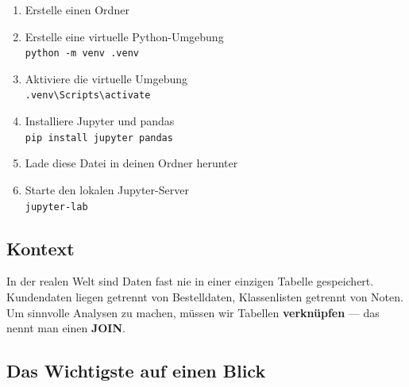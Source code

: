 \documentclass[
  nswissgerman,
  a4paper,
  DIV=11,
  numbers=noendperiod,
  ngerman]{scrreprt}
\providecommand{\tightlist}{%
  \setlength{\itemsep}{0pt}\setlength{\parskip}{0pt}}
\begin{document}
\begin{tcolorbox}[enhanced jigsaw, arc=.35mm, bottomrule=.15mm, bottomtitle=1mm, breakable, colback=white, colbacktitle=quarto-callout-note-color!10!white, colframe=quarto-callout-note-color-frame, coltitle=black, left=2mm, leftrule=.75mm, opacityback=0, opacitybacktitle=0.6, rightrule=.15mm, title=\textcolor{quarto-callout-note-color}{\faInfo}\hspace{0.5em}{Wie man dieses Notebook lokal ausführt}, titlerule=0mm, toprule=.15mm, toptitle=1mm]

\begin{enumerate}
\def\labelenumi{\arabic{enumi}.}
\tightlist
\item
  Erstelle einen Ordner
\item
  Erstelle eine virtuelle Python-Umgebung\\
  \texttt{python\ -m\ venv\ .venv}
\item
  Aktiviere die virtuelle Umgebung\\
  \texttt{.venv\textbackslash{}Scripts\textbackslash{}activate}
\item
  Installiere Jupyter und pandas\\
  \texttt{pip\ install\ jupyter\ pandas}
\item
  Lade diese Datei in deinen Ordner herunter
\item
  Starte den lokalen Jupyter-Server\\
  \texttt{jupyter-lab}
\end{enumerate}

\end{tcolorbox}

\subsection{Kontext}\label{kontext}

In der realen Welt sind Daten fast nie in einer einzigen Tabelle
gespeichert. Kundendaten liegen getrennt von Bestelldaten, Klassenlisten
getrennt von Noten. Um sinnvolle Analysen zu machen, müssen wir Tabellen
\textbf{verknüpfen} --- das nennt man einen \textbf{JOIN}.

\subsection{Das Wichtigste auf einen
Blick}\label{das-wichtigste-auf-einen-blick}
\end{document}
